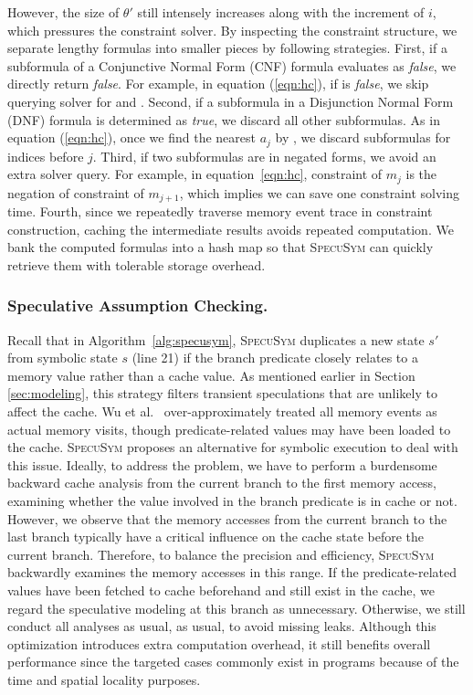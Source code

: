 \documentclass[sigconf]{acmart}
\newcommand*\circled[1]{\tikz[baseline=(char.base)]{
				\node[shape=circle,draw,inner sep=1pt] (char) {\scriptsize{#1}};}}
\newcommand{\SpecuSym}{\textsc{SpecuSym} }
\begin{document}
However, the size of $\theta'$ still intensely increases along with the 
increment of $i$, which pressures the constraint solver. By inspecting 
the constraint structure, we separate lengthy formulas into smaller 
pieces by following strategies. First, if a subformula of a Conjunctive 
Normal Form (CNF) formula evaluates as \textit{false}, we directly return 
\textit{false}. For example, in equation (\ref{eqn:hc}), if \circled{4} 
is \textit{false}, we skip querying solver for \circled{5} and \circled{6}. 
Second, if a subformula in a Disjunction Normal Form (DNF) formula is 
determined as \textit{true}, we discard all other subformulas. As in 
equation (\ref{eqn:hc}), once we find the nearest $\mathit{a_j}$ by 
\circled{5}, we discard subformulas for indices before $j$. Third, if 
two subformulas are in negated forms, we avoid an extra solver query. For 
example, in equation~\ref{eqn:hc}, constraint \circled{5} of $\mathit{m_j}$ 
is the negation of constraint \circled{4} of $\mathit{m}_{\mathit{j}+1}$, 
which implies we can save one constraint solving time. Fourth, since we 
repeatedly traverse memory event trace in constraint construction, caching 
the intermediate results avoids repeated computation. We bank the computed 
formulas into a hash map so that \SpecuSym can quickly retrieve them with 
tolerable storage overhead. 



\subsubsection{Speculative Assumption Checking.}
Recall that in Algorithm~\ref{alg:specusym}, \SpecuSym duplicates a new state 
$s'$ from symbolic state $s$ (line 21) if the branch predicate closely relates 
to a memory value rather than a cache value. As mentioned earlier in Section
\ref{sec:modeling}, this strategy filters transient speculations that are unlikely 
to affect the cache. Wu et al.~\cite{WuW19} over-approximately treated all memory 
events as actual memory visits, though predicate-related values may have been 
loaded to the cache. \SpecuSym proposes an alternative for symbolic execution to 
deal with this issue. Ideally, to address the problem, we have to perform a 
burdensome backward cache analysis from the current branch to the first memory 
access, examining whether the value involved in the branch predicate is in cache 
or not. However, we observe that the memory accesses from the current branch 
to the last branch typically have a critical influence on the cache state before 
the current branch. Therefore, to balance the precision and efficiency, \SpecuSym 
backwardly examines the memory accesses in this range. If the predicate-related 
values have been fetched to cache beforehand and still exist in the cache, we 
regard the speculative modeling at this branch as unnecessary. Otherwise, we still 
conduct all analyses as usual, as usual, to avoid missing leaks. Although this 
optimization introduces extra computation overhead, it still benefits overall 
performance since the targeted cases commonly exist in programs because of the time 
and spatial locality purposes.
\end{document}
